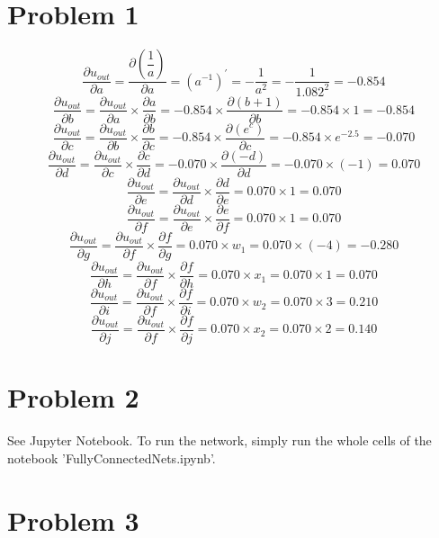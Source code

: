 \documentclass[twoside,12pt]{homework}
\begin{document}
\maketitle

\section*{Problem 1}

\[\frac{\partial u_{out}}{\partial a} = \frac{\partial(\dfrac{1}{a})}{\partial a} = (a^{-1})^\prime = -\frac{1}{a^2} = -\frac{1}{1.082^2} = -0.854\]
\[\frac{\partial u_{out}}{\partial b} = \frac{\partial u_{out}}{\partial a} \times \frac{\partial a}{\partial b} = -0.854 \times \frac{\partial(b + 1)}{\partial b} = -0.854 \times 1 = -0.854\]
\[\frac{\partial u_{out}}{\partial c} = \frac{\partial u_{out}}{\partial b} \times \frac{\partial b}{\partial c} = -0.854 \times \frac{\partial(e^c)}{\partial c} = -0.854 \times e^{-2.5} = -0.070\]
\[\frac{\partial u_{out}}{\partial d} = \frac{\partial u_{out}}{\partial c} \times \frac{\partial c}{\partial d} = -0.070 \times \frac{\partial(-d)}{\partial d} = -0.070 \times (-1) = 0.070\]
\[\frac{\partial u_{out}}{\partial e} = \frac{\partial u_{out}}{\partial d} \times \frac{\partial d}{\partial e} = 0.070 \times 1 = 0.070\]
\[\frac{\partial u_{out}}{\partial f} = \frac{\partial u_{out}}{\partial e} \times \frac{\partial e}{\partial f} = 0.070 \times 1 = 0.070\]
\[\frac{\partial u_{out}}{\partial g} = \frac{\partial u_{out}}{\partial f} \times \frac{\partial f}{\partial g} = 0.070 \times w_1 = 0.070 \times (-4) = -0.280\]
\[\frac{\partial u_{out}}{\partial h} = \frac{\partial u_{out}}{\partial f} \times \frac{\partial f}{\partial h} = 0.070 \times x_1 = 0.070 \times 1 = 0.070\]
\[\frac{\partial u_{out}}{\partial i} = \frac{\partial u_{out}}{\partial f} \times \frac{\partial f}{\partial i} = 0.070 \times w_2 = 0.070 \times 3 = 0.210\]
\[\frac{\partial u_{out}}{\partial j} = \frac{\partial u_{out}}{\partial f} \times \frac{\partial f}{\partial j} = 0.070 \times x_2 = 0.070 \times 2 = 0.140\]

\newpage
\section*{Problem 2}

See Jupyter Notebook. To run the network, simply run the whole cells of the notebook 'FullyConnectedNets.ipynb'.

\newpage
\section*{Problem 3}
\end{document}
